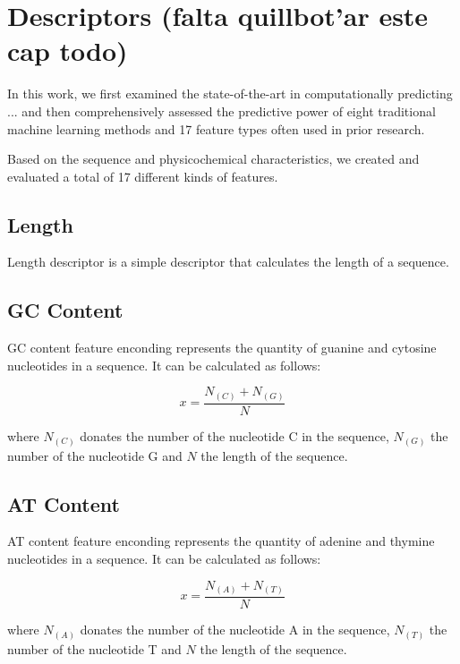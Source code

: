 \chapter{Descriptors (falta quillbot'ar este cap todo)}
\label{cha:descriptors}

In this work, we first examined the state-of-the-art in computationally predicting ... and then comprehensively assessed the predictive power of eight traditional machine learning methods and 17 feature types often used in prior research.

Based on the sequence and physicochemical characteristics, we created and evaluated a total of 17 different kinds of features.

\section{Length}

Length descriptor is a simple descriptor that calculates the length of a sequence.

\section{GC Content}

\gls{GC} content feature enconding represents the quantity of guanine and cytosine nucleotides in a sequence. It can be calculated as follows:

\begin{equation}\label{eq:gc_content}
    x = \frac{N_{(C)} + N_{(G)}}{N}
\end{equation}


where $N_{(C)}$ donates the number of the nucleotide C in the sequence, $N_{(G)}$ the number of the nucleotide G and $N$ the length of the sequence.

\section{AT Content}

\gls{AT} content feature enconding represents the quantity of adenine and thymine nucleotides in a sequence. It can be calculated as follows:


\begin{equation}\label{eq:at_content}
    x = \frac{N_{(A)} + N_{(T)}}{N}
\end{equation}

where $N_{(A)}$ donates the number of the nucleotide A in the sequence, $N_{(T)}$ the number of the nucleotide T and $N$ the length of the sequence.

